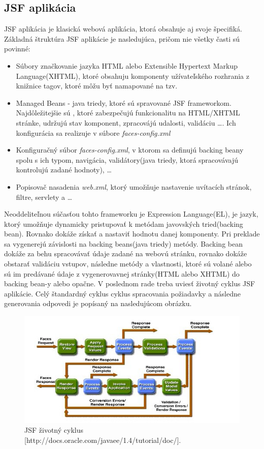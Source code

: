 \subsection{JSF aplikácia}
JSF aplikácia je klasická webová aplikácia, ktorá obsahuje aj svoje špecifiká. Základná štruktúra JSF aplikácie je nasledujúca, pričom nie všetky časti sú povinné:
\begin{itemize}
\item Súbory značkovanie jazyka HTML alebo Extensible Hypertext Markup Language(XHTML)\cite{xhtmlbook}, ktoré obsahuju komponenty užívateľského rozhrania z knižnice tagov, ktoré môžu byť namapované na tzv. 
\item Managed Beans - java triedy, ktoré sú spravované JSF frameworkom. Najdôležitejšie sú , ktoré zabezpečujú funkcionalitu na HTML/XHTML stránke, udržujú stav komponent, zpracovájú udalosti, validáciu \ldots. Ich konfigurácia sa realizuje v súbore \emph{faces-config.xml}
\item Konfiguračný súbor \emph{faces-config.xml}, v ktorom sa definujú backing beany spolu s ich typom, navigácia, validátory(java triedy, ktorá spracovávajú kontrolujú zadané hodnoty), \ldots
\item Popisovač nasadenia \emph{web.xml}, ktorý umožňuje nastavenie uvítacích stránok, filtre, servlety a \ldots
\end{itemize}
Neoddeliteľnou súčasťou tohto frameworku je Expression Language(EL), je jazyk, ktorý umožňuje dynamicky pristupovať k metódam javovských tried(backing bean). Rovnako dokáže získať a nastaviť hodnotu danej komponenty. Pri preklade sa vygenerejú závislosti na backing beans(java triedy) metódy. Backing bean dokáže za behu spracovávať údaje zadané na webovú stránku, rovnako dokáže obstarať validáciu vstupov,  následne metódy a vlastnosti, ktoré sú volané alebo sú im predávané údaje z vygenerovavnej stránky(HTML alebo XHTML) do backing bean-y alebo opačne. 
V poslednom rade treba uviesť životný cyklus JSF aplikácie.
Celý štandardný cyklus cyklus spracovania požiadavky a následne generovania odpovedi je popísaný na nasledujúcom obrázku.
\begin{figure}[htb]

\begin{center}

\includegraphics[scale=0.7]{jsflifecycle.jpg} 
\caption{JSF životný cyklus [http://docs.oracle.com/javaee/1.4/tutorial/doc/]. }
\label{lifecycle}

\end{center}

\end{figure}
